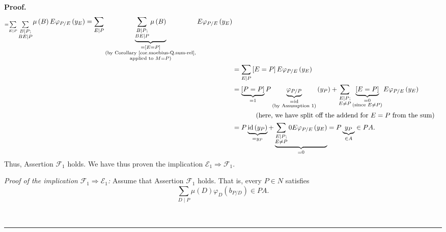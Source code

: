 \documentclass[numbers=enddot,12pt,final,onecolumn,notitlepage]{scrartcl}%
\theoremstyle{definition}
\newenvironment{proof}[1][Proof]{\noindent\textbf{#1.} }{\ \rule{0.5em}{0.5em}}
\let\sumnonlimits\sum
\renewcommand{\sum}{\sumnonlimits\limits}
\begin{document}
\begin{proof}
\begin{align*}
_{=\sum_{E\mid P}\sum_{\substack{B\mid P;\\BE\mid P}}}\mu\left(  B\right)
E\varphi_{P/E}\left(  y_{E}\right)  =\sum_{E\mid P}\underbrace{\sum
_{\substack{B\mid P;\\BE\mid P}}\mu\left(  B\right)  }_{\substack{=\left[
E=P\right]  \\\text{(by Corollary \ref{cor.moebius-Q.sum-rel},}\\\text{applied
to }M=P\text{)}}}E\varphi_{P/E}\left(  y_{E}\right) \\
&  =\sum_{E\mid P}\left[  E=P\right]  E\varphi_{P/E}\left(  y_{E}\right) \\
&  =\underbrace{\left[  P=P\right]  }_{=1}P\underbrace{\varphi_{P/P}%
}_{\substack{=\operatorname*{id}\\\text{(by Assumption 1)}}}\left(
y_{P}\right)  +\sum_{\substack{E\mid P;\\E\neq P}}\underbrace{\left[
E=P\right]  }_{\substack{=0\\\text{(since }E\neq P\text{)}}}E\varphi
_{P/E}\left(  y_{E}\right) \\
&  \ \ \ \ \ \ \ \ \ \ \left(  \text{here, we have split off the addend for
}E=P\text{ from the sum}\right) \\
&  =P\underbrace{\operatorname*{id}\left(  y_{P}\right)  }_{=y_{P}%
}+\underbrace{\sum_{\substack{E\mid P;\\E\neq P}}0E\varphi_{P/E}\left(
y_{E}\right)  }_{=0}=P\underbrace{y_{P}}_{\in A}\in PA.
\end{align*}
Thus, Assertion $\mathcal{F}_{1}$ holds. We have thus proven the implication
$\mathcal{E}_{1}\Longrightarrow\mathcal{F}_{1}$.

\textit{Proof of the implication }$\mathcal{F}_{1}\Longrightarrow
\mathcal{E}_{1}$\textit{:} Assume that Assertion $\mathcal{F}_{1}$ holds. That
is, every $P\in N$ satisfies%
\begin{equation}
\sum_{D\mid P}\mu\left(  D\right)  \varphi_{D}\left(  b_{P/D}\right)  \in PA.
\label{pf.thm.F.gW.FtoE.ass}%
\end{equation}



\end{proof}
\end{document}

